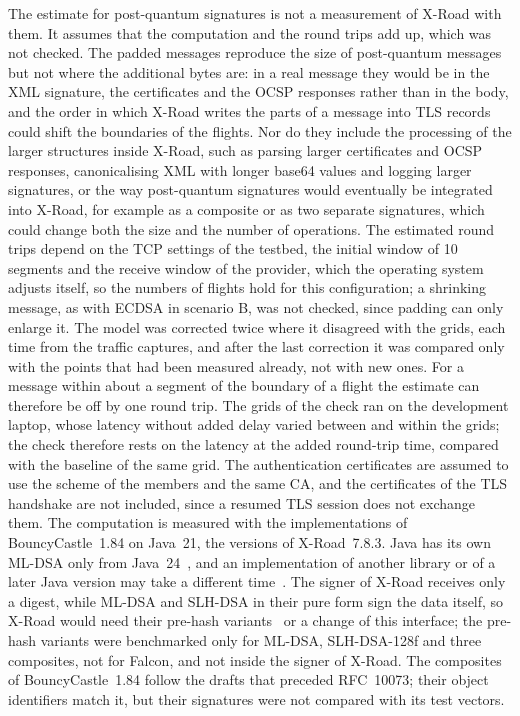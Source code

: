 \documentclass[conference,a4paper]{IEEEtran}
\newcommand{\newtext}[1]{{\color{blue}#1}}
\begin{document}
\newtext{The estimate for post-quantum signatures is not a measurement of X-Road with them. It
assumes that the computation and the round trips add up, which was not checked.} \newtext{The padded
messages reproduce the size of post-quantum messages but not where the additional bytes are: in a
real message they would be in the XML signature, the certificates and the OCSP responses rather than
in the body, and the order in which X-Road writes the parts of a message into TLS records could shift
the boundaries of the flights. Nor do they include the processing of the larger structures inside
X-Road, such as parsing larger certificates and OCSP responses, canonicalising XML with longer
base64 values and logging larger signatures, or the way post-quantum signatures would eventually be
integrated into X-Road, for example as a composite or as two separate signatures, which could change
both the size and the number of operations.} \newtext{The} \newtext{estimated} \newtext{round trips depend on the TCP settings of the testbed, the initial window of 10 segments and the
receive window of the provider, which the operating system adjusts itself, so the numbers of flights
hold for this configuration; a shrinking message, as with ECDSA in scenario B, was not checked, since
padding can only enlarge it. \newtext{The model was corrected twice where it disagreed with the
grids, each time from the traffic captures, and after the last correction it was compared only with
the points that had been measured already, not with new ones. For a message within about a segment
of the boundary of a flight the estimate can therefore be off by one round trip.} \newtext{The grids of the check
ran on the development laptop, whose latency without added delay varied between and within the
grids; the check therefore rests on the latency at the added round-trip time, compared with the
baseline of the same grid.} The authentication certificates are assumed to use the scheme of the
members and the same CA, and the certificates of the TLS handshake are not included, since a resumed
TLS session does not exchange them. The computation is measured with the
implementations of BouncyCastle~1.84 on Java~21, the versions of X-Road~7.8.3. Java has its own
ML-DSA only from Java~24~\cite{jep497}, and an implementation of another library or of a later Java
version may take a different time~\cite{oleksiichuk2026}. The
signer of X-Road receives only a digest, while ML-DSA and SLH-DSA in their pure form sign the data
itself, so X-Road would need their pre-hash variants~\cite{fips204,fips205} or a change of this
interface; \newtext{the pre-hash variants were benchmarked only for ML-DSA, SLH-DSA-128f and three
composites, not for Falcon, and not inside the signer of X-Road}. The
composites of BouncyCastle~1.84 follow the drafts that preceded RFC~10073; their object identifiers
match it, but their signatures were not compared with its test vectors.}
\end{document}
